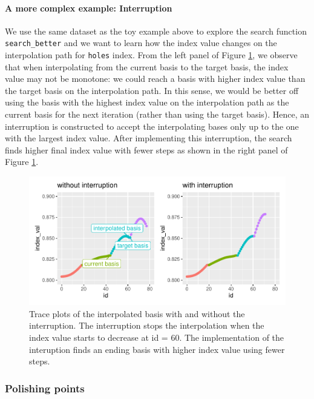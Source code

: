 \documentclass[12pt]{article}
\begin{document}
\hypertarget{a-more-complex-example-interruption}{%
\paragraph{A more complex example:
Interruption}\label{a-more-complex-example-interruption}}

We use the same dataset as the toy example above to explore the search
function \texttt{search\_better} and we want to learn how the index
value changes on the interpolation path for \texttt{holes} index. From
the left panel of Figure \ref{interruption}, we observe that when
interpolating from the current basis to the target basis, the index
value may not be monotone: we could reach a basis with higher index
value than the target basis on the interpolation path. In this sense, we
would be better off using the basis with the highest index value on the
interpolation path as the current basis for the next iteration (rather
than using the target basis). Hence, an interruption is constructed to
accept the interpolating bases only up to the one with the largest index
value. After implementing this interruption, the search finds higher
final index value with fewer steps as shown in the right panel of Figure
\ref{interruption}.

\begin{figure}
\centering
\includegraphics{paper_files/figure-latex/interruption-1.pdf}
\caption{\label{interruption}Trace plots of the interpolated basis with
and without the interruption. The interruption stops the interpolation
when the index value starts to decrease at id = 60. The implementation
of the interuption finds an ending basis with higher index value using
fewer steps.}
\end{figure}

\hypertarget{polishing-points}{%
\subsubsection{Polishing points}\label{polishing-points}}
\end{document}
